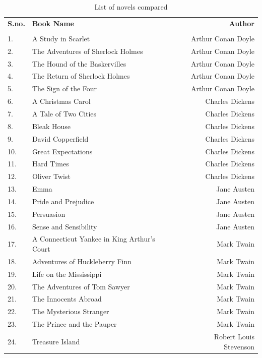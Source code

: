 \documentclass[%
 aip,
rsi,%
 amsmath,amssymb,
 reprint,%
author-year,
groupedaddress
]{revtex4-1}
\begin{document}
\begin{table}[!htb]
\centering
\begin{tabular}{l l r}
 {\bf S.no.} & {\bf Book Name} & {\bf Author} \\ \\
  1. & A Study in Scarlet & Arthur Conan Doyle \\
  2. & The Adventures of Sherlock Holmes & Arthur Conan Doyle \\
  3. & The Hound of the Baskervilles & Arthur Conan Doyle \\
  4. & The Return of Sherlock Holmes & Arthur Conan Doyle \\
  5. & The Sign of the Four & Arthur Conan Doyle \\
  6. & A Christmas Carol & Charles Dickens \\
  7. & A Tale of Two Cities & Charles Dickens \\
  8. & Bleak House & Charles Dickens \\
  9. & David Copperfield & Charles Dickens \\
  10. & Great Expectations & Charles Dickens \\
  11. & Hard Times & Charles Dickens \\
  12. & Oliver Twist & Charles Dickens \\
  13. & Emma & Jane Austen \\
  14. & Pride and Prejudice & Jane Austen \\
  15. & Persuasion & Jane Austen \\
  16. & Sense and Sensibility & Jane Austen \\
  17. & A Connecticut Yankee in King Arthur's Court & Mark Twain \\
  18. & Adventures of Huckleberry Finn & Mark Twain \\
  19. & Life on the Mississippi & Mark Twain \\
  20. & The Adventures of Tom Sawyer & Mark Twain \\
  21. & The Innocents Abroad & Mark Twain \\
  22. & The Mysterious Stranger & Mark Twain \\
  23. & The Prince and the Pauper & Mark Twain \\
  24. & Treasure Island & Robert Louis Stevenson \\
\end{tabular}
\caption{List of novels compared}
\label{table:books}
\end{table}
\end{document}
